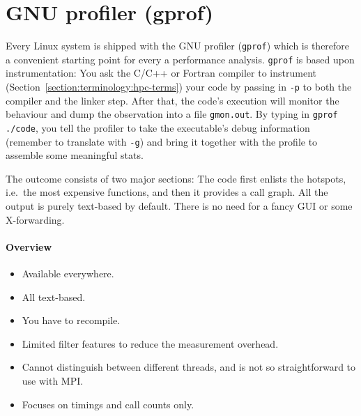 \section{GNU profiler (gprof)} 
\label{section:localisation:gprof}

Every Linux system is shipped with the GNU profiler (\texttt{gprof}) which is
therefore a convenient starting point for every a performance analysis.
\texttt{gprof} is based upon instrumentation:
You ask the C/C++ or Fortran compiler to instrument
(Section~\ref{section:terminology:hpc-terms}) your code by passing in
\texttt{-p} to both the compiler and the linker step.
After that, the code's execution will monitor the behaviour and dump the
observation into a file \texttt{gmon.out}.
By typing in \texttt{gprof ./code}, you tell the profiler to take the
executable's debug information (remember to translate with \texttt{-g}) and
bring it together with the profile to assemble some meaningful stats.


The outcome consists of two major sections: 
The code first enlists the hotspots, i.e.~the most expensive functions, and then
it provides a call graph.
All the output is purely text-based by default.
There is no need for a fancy GUI or some X-forwarding.



\paragraph*{Overview}
 
\begin{itemize}[noitemsep]
  \item[$\boxplus$] Available everywhere.
  \item[$\boxplus$] All text-based.
\end{itemize}
 
 
\begin{itemize}[noitemsep]
  \item[$\boxminus$] You have to recompile.
  \item[$\boxminus$] Limited filter features to reduce the measurement overhead.
  \item[$\boxminus$] Cannot distinguish between different threads, and is not so
  straightforward to use with MPI. 
  \item[$\boxminus$] Focuses on timings and call counts only.
\end{itemize}

